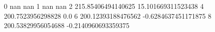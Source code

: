 0 nan nan
1 nan nan
2 215.85406494140625 15.101669311523438
4 200.7523956298828 0.0
6 200.12393188476562 -0.6284637451171875
8 200.53829956054688 -0.2140960693359375
